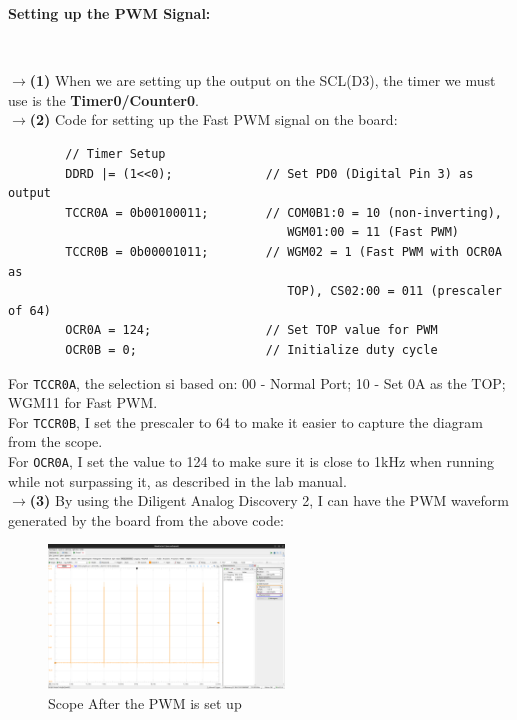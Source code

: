 \documentclass{report}
\begin{document}
    \begin{minipage}{\textwidth}
        \Large
        \textbf{Setting up the PWM Signal:}
    \end{minipage}\\[0.5em]
    \begin{minipage}{\textwidth}
       $\rightarrow$\textbf{(1)} When we are setting up the output on the SCL(D3), the timer we must use is the \textbf{Timer0/Counter0}.\\
       $\rightarrow$\textbf{(2)} Code for setting up the Fast PWM signal on the board:
       \begin{verbatim}
        // Timer Setup
        DDRD |= (1<<0);             // Set PD0 (Digital Pin 3) as output
        TCCR0A = 0b00100011;        // COM0B1:0 = 10 (non-inverting), 
                                       WGM01:00 = 11 (Fast PWM)
        TCCR0B = 0b00001011;        // WGM02 = 1 (Fast PWM with OCR0A as 
                                       TOP), CS02:00 = 011 (prescaler of 64)
        OCR0A = 124;                // Set TOP value for PWM
        OCR0B = 0;                  // Initialize duty cycle
       \end{verbatim}
       For \texttt{TCCR0A}, the selection si based on: 00 - Normal Port; 10 - Set 0A as the TOP; WGM11 for Fast PWM.\\
       For \texttt{TCCR0B}, I set the prescaler to 64 to make it easier to capture the diagram from the scope. \\
       For \texttt{OCR0A}, I set the value to 124 to make sure it is close to 1kHz when running while not surpassing it, as described in the lab manual.\\
       $\rightarrow$\textbf{(3)} By using the Diligent Analog Discovery 2, I can have the PWM waveform generated by the board from the above code:
    \end{minipage}
    \begin{figure}[H]
        \centering 
        \includegraphics[width = 0.56\textwidth]{scope1.png}
        \caption{Scope After the PWM is set up}
   \end{figure}
\end{document}
